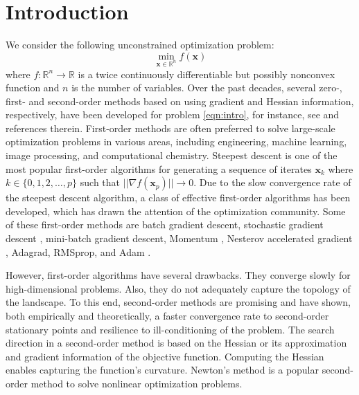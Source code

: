 \documentclass{elsarticle}
\numberwithin{equation}{section}
\begin{document}
\section{Introduction}
We consider the following unconstrained optimization problem: 
\begin{equation} \label{eqn:intro}
    \min_{\mathbf{x} \in \mathbb{R}^{n}} f(\mathbf{x})
\end{equation}
where \( f: \mathbb{R}^n \to \mathbb{R} \) is a twice continuously differentiable but possibly nonconvex function and $n$ is the number of variables. Over the past decades, several zero-, first- and second-order methods based on using gradient and Hessian information, respectively, have been developed for problem \eqref{eqn:intro}, for instance, see {\cite{cartis2010complexity, gratton2025yet, liu1989limited, nesterov2006cubic, Shanno1970ConditioningOQ, zhang1999new}} and references therein. First-order methods are often preferred to solve large-scale optimization problems in various areas, including engineering, machine learning, image processing, and computational chemistry. Steepest descent is one of the most popular first-order algorithms for generating a sequence of iterates $\mathbf{x}_k$ where $k \in \{0, 1, 2, \dots, p\}$ such that \(||\nabla f(\mathbf{x}_p)|| \xrightarrow{} 0\). Due to the slow convergence rate of the steepest descent algorithm, a class of effective first-order algorithms has been developed, which has drawn the attention of the optimization community. Some of these first-order methods are batch gradient descent, stochastic gradient descent \cite{robbins1951stochastic}, mini-batch gradient descent, Momentum \cite{qian1999momentum,liu2020improved}, Nesterov accelerated gradient \cite{ghadimi2016accelerated,1370862715914709505}, Adagrad, RMSprop, and Adam \cite{kingma2014adam, mcmahan2010adaptive, zeiler2012adadeltaadaptivelearningrate}.

However, first-order algorithms have several drawbacks.  They converge slowly for high-dimensional problems. Also, they do not adequately capture the topology of the landscape. 
To this end, second-order methods are promising and have shown, both empirically and theoretically, a faster convergence rate to second-order stationary points and resilience to ill-conditioning of the problem. The search direction in a second-order method is based on the Hessian or its approximation and gradient information of the objective function. Computing the Hessian enables capturing the function's curvature. Newton's method is a popular second-order method to solve nonlinear optimization problems. 
\end{document}
